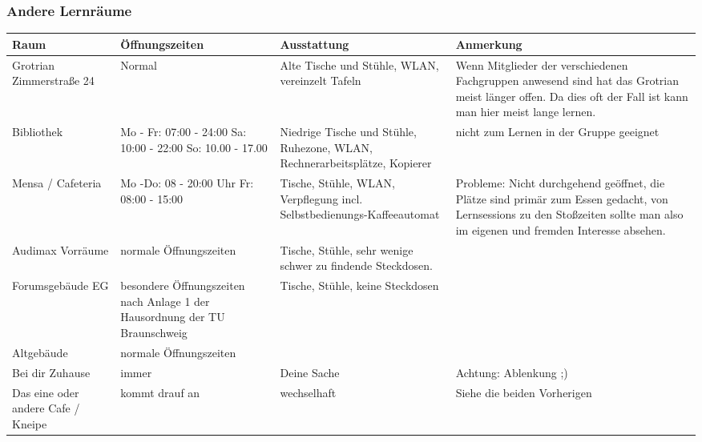 	\subsubsection*{Andere Lernräume}
		\begin{tabular}{|p{4cm}|p{5cm}|p{3.6cm}|p{4cm}|}
 			\hline Raum & Öffnungszeiten & Ausstattung & Anmerkung  \\  
			\hline Grotrian  Zimmerstraße 24 & Normal  &
			Alte Tische und Stühle, WLAN, vereinzelt Tafeln & Wenn Mitglieder der verschiedenen Fachgruppen anwesend sind hat das Grotrian meist länger offen. Da dies oft der Fall ist kann man hier meist lange lernen. \\ 
			\hline Bibliothek & Mo - Fr: 07:00 - 24:00 Sa:
			10:00 - 22:00 So: 10.00 - 17.00 & Niedrige Tische und Stühle,
			Ruhezone, WLAN, Rechnerarbeits\-plätze, Kopierer &  nicht zum  Lernen in der Gruppe  geeignet \\ 
			\hline Mensa / Cafeteria & Mo -Do: 08 - 20:00 Uhr Fr: 08:00 - 15:00 & Tische, Stühle,  WLAN,  Verpflegung incl. Selbstbedienungs-Kaffeeautomat& Probleme: Nicht durchgehend geöffnet, die Plätze sind primär zum Essen gedacht, von Lernsessions zu den Stoßzeiten sollte man also im eigenen und fremden Interesse absehen. \\ 
			\hline Audimax Vorräume & normale Öffnungszeiten & Tische, Stühle, sehr wenige schwer zu findende Steckdosen. & \\
			\hline Forumsgebäude EG & besondere Öffnungszeiten nach Anlage 1 der Hausordnung der TU Braunschweig & Tische, Stühle, keine Steckdosen & \\
			\hline Altgebäude & normale Öffnungszeiten &  &  \\ 
			\hline Bei dir Zuhause & immer & Deine Sache & Achtung: Ablenkung ;) \\ 
			\hline Das eine oder andere Cafe / Kneipe & kommt drauf an & wechselhaft & Siehe die beiden Vorherigen \\
			\hline
		\end{tabular}
